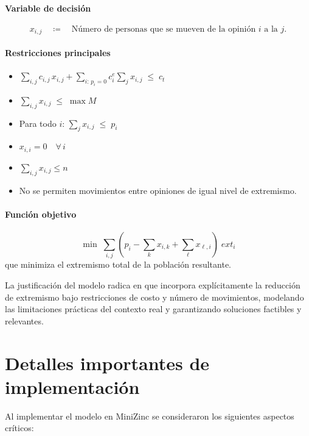 \documentclass[11pt,letter]{article}
\begin{document}
\paragraph{Variable de decisión}
\[
  x_{i,j} \quad\coloneqq\quad \text{Número de personas que se mueven de la opinión }i\text{ a la }j.
\]

\paragraph{Restricciones principales}
\begin{itemize}
  \item $\displaystyle \sum_{i,j} c_{i,j}\,x_{i,j} + \sum_{i:\,p_i=0} c^e_i \sum_j x_{i,j} \;\le\; c_t$
  \item $\displaystyle \sum_{i,j} x_{i,j} \;\le\; \max M$
  \item Para todo $i$: $\displaystyle \sum_j x_{i,j} \;\le\; p_i$
  \item $x_{i,i} = 0\quad\forall\,i$
  \item $\displaystyle \sum_{i,j} x_{i,j} \le n$
  \item No se permiten movimientos entre opiniones de igual nivel de extremismo.
\end{itemize}

\paragraph{Función objetivo}
\[
  \min\;\sum_{i,j} (p_i - \sum_{k} x_{i,k} + \sum_{\ell} x_{\ell,i})\;\mathit{ext}_i
\]
que minimiza el extremismo total de la población resultante.

\medskip

La justificación del modelo radica en que incorpora explícitamente la reducción de extremismo bajo restricciones de costo y número de movimientos, modelando las limitaciones prácticas del contexto real y garantizando soluciones factibles y relevantes.


\section{Detalles importantes de implementación}

Al implementar el modelo en MiniZinc se consideraron los siguientes aspectos críticos:
\end{document}
